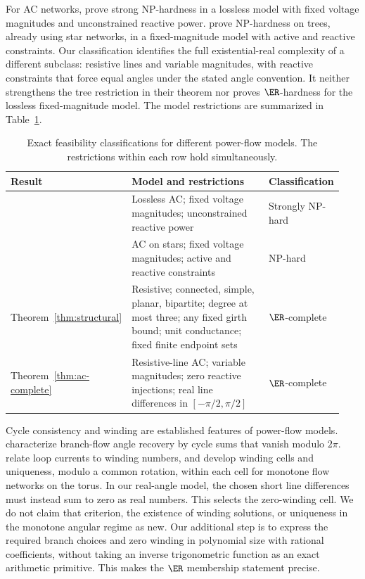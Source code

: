 For AC networks, \citet{BienstockVerma2019} prove strong NP-hardness in a
lossless model with fixed voltage magnitudes and unconstrained reactive
power. \citet{LehmannEtAl2016} prove NP-hardness on trees, already using star
networks, in a fixed-magnitude model with active and reactive constraints.
Our classification identifies the full existential-real complexity of a
different subclass: resistive lines and variable magnitudes, with reactive
constraints that force equal angles under the stated angle convention.
It neither strengthens the tree restriction in their theorem nor proves
$\ER$-hardness for the lossless fixed-magnitude model. The model
restrictions are summarized in
Table~\ref{tab:prior-complexity}.

\begin{table}[t]
\centering
\small
\caption{Exact feasibility classifications for different power-flow models.
The restrictions within each row hold simultaneously.}
\label{tab:prior-complexity}
\begin{tabular}{@{}p{0.23\linewidth}p{0.49\linewidth}p{0.22\linewidth}@{}}
\toprule
Result & Model and restrictions & Classification \\
\midrule
\citet{BienstockVerma2019} & Lossless AC; fixed voltage magnitudes;
unconstrained reactive power & Strongly NP-hard \\
\addlinespace
\citet{LehmannEtAl2016} & AC on stars; fixed voltage magnitudes;
active and reactive constraints & NP-hard \\
\addlinespace
Theorem~\ref{thm:structural} & Resistive; connected, simple, planar,
bipartite; degree at most three; any fixed girth bound; unit conductance;
fixed finite endpoint sets & $\ER$-complete \\
\addlinespace
Theorem~\ref{thm:ac-complete} & Resistive-line AC; variable magnitudes;
zero reactive injections; real line differences in $[-\pi/2,\pi/2]$
& $\ER$-complete \\
\bottomrule
\end{tabular}
\end{table}

Cycle consistency and winding are established features of power-flow
models. \citet[Theorem 2]{FarivarLow2013} characterize branch-flow angle
recovery by cycle sums that vanish modulo $2\pi$.
\citet{DelabaysEtAl2016} relate loop currents to winding numbers, and
\citet{JafarpourEtAl2022} develop winding cells and uniqueness, modulo a
common rotation, within each cell for monotone flow networks on the torus.
In our real-angle model, the
chosen short line differences must instead sum to zero as real numbers.
This selects the zero-winding cell. We do not claim that criterion, the
existence of winding solutions, or uniqueness in the monotone angular
regime as new. Our additional step is to express the required branch
choices and zero winding in polynomial size with rational coefficients,
without taking an inverse trigonometric function as an exact arithmetic
primitive. This makes the $\ER$ membership statement precise.

